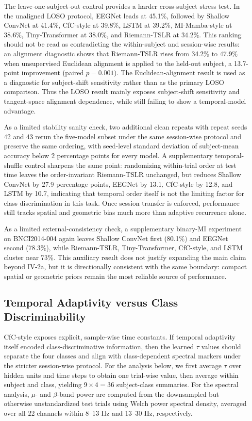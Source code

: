 \documentclass[journal]{IEEEtran}
\begin{document}
The leave-one-subject-out control provides a harder cross-subject stress test. In the unaligned LOSO protocol, EEGNet leads at 45.1\%, followed by Shallow ConvNet at 41.4\%, CfC-style at 39.8\%, LSTM at 39.2\%, MI-Mamba-style at 38.6\%, Tiny-Transformer at 38.0\%, and Riemann-TSLR at 34.2\%. This ranking should not be read as contradicting the within-subject and session-wise results: an alignment diagnostic shows that Riemann-TSLR rises from 34.2\% to 47.9\% when unsupervised Euclidean alignment is applied to the held-out subject, a 13.7-point improvement (paired $p = 0.001$). The Euclidean-alignment result is used as a diagnostic for subject-shift sensitivity rather than as the primary LOSO comparison. Thus the LOSO result mainly exposes subject-shift sensitivity and tangent-space alignment dependence, while still failing to show a temporal-model advantage.

As a limited stability sanity check, two additional clean repeats with repeat seeds 42 and 43 rerun the five-model subset under the same session-wise protocol and preserve the same ordering, with seed-level standard deviation of subject-mean accuracy below 2 percentage points for every model. A supplementary temporal-shuffle control sharpens the same point: randomizing within-trial order at test time leaves the order-invariant Riemann-TSLR unchanged, but reduces Shallow ConvNet by 27.9 percentage points, EEGNet by 13.1, CfC-style by 12.8, and LSTM by 10.7, indicating that temporal order itself is not the limiting factor for class discrimination in this task. Once session transfer is enforced, performance still tracks spatial and geometric bias much more than adaptive recurrence alone.

As a limited external-consistency check, a supplementary binary-MI experiment on BNCI2014-004 again leaves Shallow ConvNet first (80.1\%) and EEGNet second (78.3\%), while Riemann-TSLR, Tiny-Transformer, CfC-style, and LSTM cluster near 73\%. This auxiliary result does not justify expanding the main claim beyond IV-2a, but it is directionally consistent with the same boundary: compact spatial or geometric priors remain the most reliable source of performance.

\subsection{Temporal Adaptivity versus Class Discriminability}
CfC-style exposes explicit, sample-wise time constants. If temporal adaptivity itself encoded class-discriminative information, then the learned $\tau$ values should separate the four classes and align with class-dependent spectral markers under the stricter session-wise protocol. For the analysis below, we first average $\tau$ over hidden units and time steps to obtain one trial-wise value, then average within subject and class, yielding $9 \times 4 = 36$ subject-class summaries. For the spectral analysis, $\mu$- and $\beta$-band power are computed from the downsampled but otherwise unstandardized test trials using Welch power spectral density, averaged over all 22 channels within 8--13 Hz and 13--30 Hz, respectively.
\end{document}
